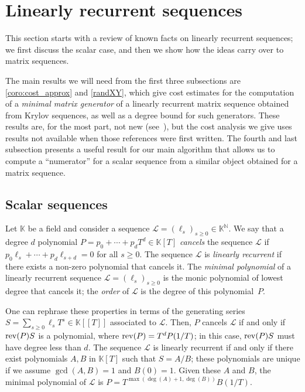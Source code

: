 \documentclass[12pt]{article}
\newcommand{\minpoly}{P}
\def\N {\ensuremath{\mathbb{N}}}
\def\K{\mathbb{K}}
\def\K {\ensuremath{\mathbb{K}}}
\begin{document}

\section{Linearly recurrent sequences}

This section starts with a review of known facts on linearly recurrent
sequences; we first discuss the scalar case, and then we show how the ideas
carry over to matrix sequences. 

The main results we will need from the first three subsections are
\cref{coro:cost_approx} and \cref{randXY}, which give cost estimates for the
computation of a {\em minimal matrix generator} of a linearly recurrent matrix
sequence obtained from Krylov sequences, as well as a degree bound for such
generators. These results are, for the most part, not new
(see~\cite{Villard97,Villard97a,KalVil01,Turner02}), but the cost analysis we
give uses results not available when those references were first written.  The
fourth and last subsection presents a useful result for our main algorithm
that allows us to compute a ``numerator'' for a scalar sequence from a similar
object obtained for a matrix sequence.


\subsection{Scalar sequences} \label{section:linseq}

Let $\K$ be a field and consider a sequence $\mathcal{L}=(\ell_s)_{s
  \ge 0} \in \K^\N$. We say that a degree $d$ polynomial $\minpoly =
p_0 + \cdots + p_d T^d \in\K[T]$ {\em cancels} the sequence
$\mathcal{L}$ if $p_0 \ell_s + \cdots + p_d \ell_{s+d}=0$ for all $s
\ge 0$. The sequence $\mathcal{L}$ is {\em linearly recurrent} if
there exists a non-zero polynomial that cancels it.  The {\em minimal
  polynomial} of a linearly recurrent sequence
$\mathcal{L}=(\ell_s)_{s \ge 0}$ is the monic polynomial of lowest
degree that cancels it; the {\em order} of $\mathcal{L}$ is the degree
of this polynomial~$\minpoly$.

One can rephrase these properties in terms of the generating series $S=\sum_{s
\ge 0} \ell_s T^s \in \K[[T]]$ associated to $\mathcal{L}$.  Then, $\minpoly$
cancels $\mathcal{L}$ if and only if ${\rm rev}(\minpoly) S$ is a polynomial,
where ${\rm rev}(\minpoly)=T^d \minpoly(1/T)$; in this case, ${\rm
rev}(\minpoly) S$ must have degree less than $d$.  The sequence $\mathcal{L}$
is linearly recurrent if and only if there exist polynomials $A,B$ in $\K[T]$
such that $S=A/B$; these polynomials are unique if we assume $\gcd(A,B)=1$ and
$B(0)=1$.  Given these $A$ and $B$, the minimal polynomial of $\mathcal{L}$ is
$\minpoly = T^{\max(\deg(A)+1,\deg(B))}B(1/T)$. 
\end{document}
